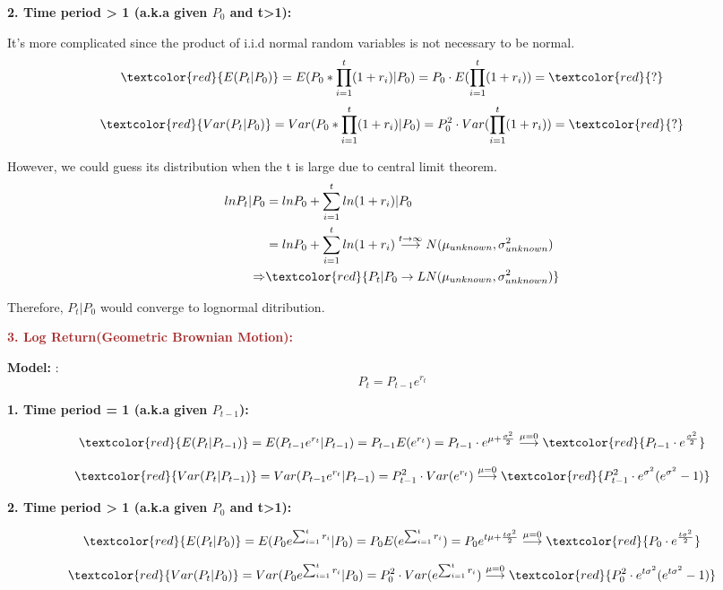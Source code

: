 \documentclass[11pt,en]{elegantpaper}
\begin{document}
\textbf{2. Time period > 1 (a.k.a given $P_0$ and t>1):}

It's more complicated since the product of i.i.d normal random variables is not necessary to be normal.
\[\textcolor{red}{E(P_t|P_0)}=E(P_0*\prod_{i=1}^{t}(1+r_i)|P_0)=P_0\cdot E(\prod_{i=1}^{t}(1+r_i))=\textcolor{red}{?}\]
\[\textcolor{red}{Var(P_t|P_0)}=Var(P_0*\prod_{i=1}^t(1+r_i)|P_0)=P_0^2\cdot Var(\prod_{i=1}^t(1+r_i))=\textcolor{red}{?}\]

However, we could guess its distribution when the t is large due to central limit theorem.
\begin{equation}
\begin{aligned}
    lnP_t|P_0&=lnP_0+\sum_{i=1}^{t}ln(1+r_i)|P_0\\
    &=lnP_0+\sum_{i=1}^{t}ln(1+r_i)\stackrel{t\to\infty}{\longrightarrow}N(\mu_{unknown},\sigma_{unknown}^2)\\
\Rightarrow &\textcolor{red}{P_t|P_0\to LN(\mu_{unknown},\sigma_{unknown}^2)}
\end{aligned}
\end{equation}

Therefore, $P_t|P_0$ would converge to lognormal ditribution.

\textbf{\textcolor{brown}{3. Log Return(Geometric Brownian Motion):}}

\textbf{Model: }:
\[P_t=P_{t-1}e^{r_t}\]

\textbf{1. Time period = 1 (a.k.a given $P_{t-1}$):}

\[\textcolor{red}{E(P_t|P_{t-1})}=E(P_{t-1}e^{r_t}|P_{t-1})=P_{t-1}E(e^{r_t})=P_{t-1}\cdot e^{\mu+\frac{\sigma^2}{2}}\stackrel{\mu=0}{\longrightarrow}\textcolor{red}{P_{t-1}\cdot e^{\frac{\sigma^2}{2}}}
\]

\[\textcolor{red}{Var(P_t|P_{t-1})}=Var(P_{t-1}e^{r_t}|P_{t-1})=P_{t-1}^2\cdot Var(e^{r_t})\stackrel{\mu=0}{\longrightarrow}\textcolor{red}{P_{t-1}^2\cdot e^{\sigma^2}(e^{\sigma^2}-1)} \]

\textbf{2. Time period > 1 (a.k.a given $P_0$ and t>1):}

\[\textcolor{red}{E(P_t|P_0)}=E(P_0e^{\sum_{i=1}^tr_i}|P_0)=P_0E(e^{\sum_{i=1}^tr_i})=P_0e^{t\mu+\frac{t\sigma^2}{2}}\stackrel{\mu=0}{\longrightarrow}\textcolor{red}{P_{0}\cdot e^{\frac{t\sigma^2}{2}}}
\]

\[\textcolor{red}{Var(P_t|P_0)}=Var(P_0e^{\sum_{i=1}^tr_i}|P_0)=P_0^2\cdot Var(e^{\sum_{i=1}^tr_i})\stackrel{\mu=0}{\longrightarrow}\textcolor{red}{P_0^2\cdot e^{t\sigma^2}(e^{t\sigma^2}-1)}\]
\end{document}
